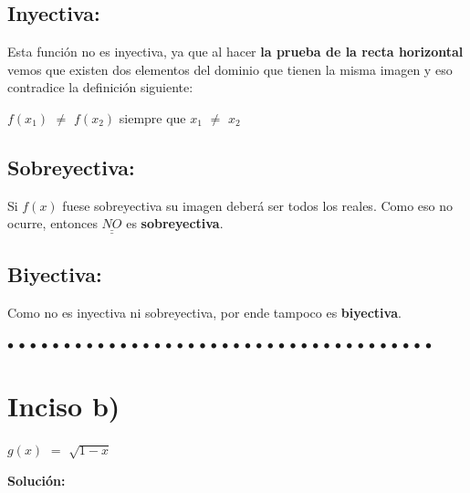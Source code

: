\documentclass[12pt]{article}
\def\doubleunderline#1{\underline{\underline{#1}}}
\newenvironment{MyColorPar}[1]{%
    \leavevmode\color{#1}\ignorespaces%
}{%
}%
\begin{document}
\subsection*{{\textcolor{Lochinvar}{\bfseries{Inyectiva}:}}} Esta función no es inyectiva, ya que al hacer {\bfseries{la prueba de la recta horizontal}} vemos que existen dos elementos del dominio que tienen la misma imagen y eso contradice la definición siguiente: \vspace{0.5cm}

\hspace{4cm} $f(x_{1})$ $\neq$ $f(x_{2})$ siempre que $x_{1}$ $\neq$ $x_{2}$ \vspace{0.5cm}

\subsection*{{\textcolor{Lochinvar}{\bfseries{Sobreyectiva}:}}} Si $f(x)$ fuese sobreyectiva su imagen deberá ser todos los reales. Como eso no ocurre, entonces {$\doubleunderline{NO}$} es {\bfseries{sobreyectiva}}. \vspace{0.5cm}

\subsection*{{\textcolor{Lochinvar}{\bfseries{Biyectiva}:}}} Como no es inyectiva ni sobreyectiva, por ende tampoco es {\bfseries{biyectiva}}. \vspace{0.5cm}

\begin{MyColorPar}{Saffron} \bfseries{
 $\bullet$ $\bullet$ $\bullet$ $\bullet$ $\bullet$ $\bullet$ $\bullet$ $\bullet$ $\bullet$ $\bullet$ $\bullet$ $\bullet$ $\bullet$ $\bullet$ $\bullet$ $\bullet$ $\bullet$ $\bullet$ $\bullet$ $\bullet$ $\bullet$ $\bullet$ $\bullet$ $\bullet$ $\bullet$ $\bullet$ $\bullet$ $\bullet$ $\bullet$ $\bullet$ $\bullet$ $\bullet$ $\bullet$ $\bullet$ $\bullet$ $\bullet$ $\bullet$ $\bullet$  }
\end{MyColorPar} \vspace{0.5cm}

\section*{{\textcolor{Tarawera}{\textsf{Inciso b)}}}} $g(x)$ $=$ $\sqrt{1-x}$ \vspace{0.5cm}

{\textcolor{Cinnabar}{\bfseries{Solución}:}} \vspace{0.5cm}
\end{document}
